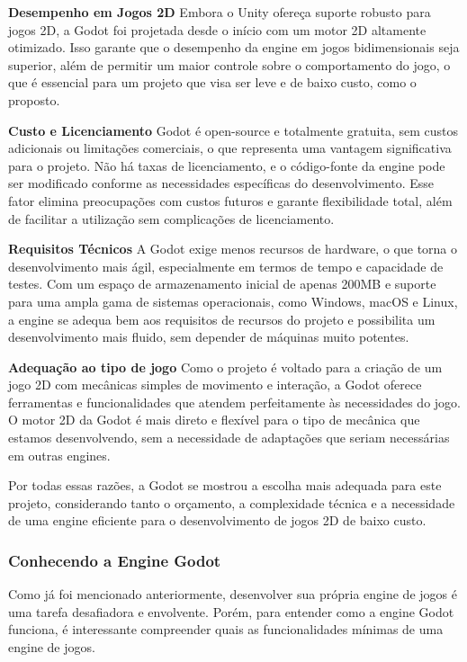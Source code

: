 \textbf{Desempenho em Jogos 2D}
Embora o Unity ofereça suporte robusto para jogos 2D, a Godot foi projetada desde o início com um motor 2D altamente otimizado. Isso garante que o desempenho da engine em jogos bidimensionais seja superior, além de permitir um maior controle sobre o comportamento do jogo, o que é essencial para um projeto que visa ser leve e de baixo custo, como o proposto.

\textbf{Custo e Licenciamento}
Godot é open-source e totalmente gratuita, sem custos adicionais ou limitações comerciais, o que representa uma vantagem significativa para o projeto. Não há taxas de licenciamento, e o código-fonte da engine pode ser modificado conforme as necessidades específicas do desenvolvimento. Esse fator elimina preocupações com custos futuros e garante flexibilidade total, além de facilitar a utilização sem complicações de licenciamento.

\textbf{Requisitos Técnicos}
A Godot exige menos recursos de hardware, o que torna o desenvolvimento mais ágil, especialmente em termos de tempo e capacidade de testes. Com um espaço de armazenamento inicial de apenas 200MB e suporte para uma ampla gama de sistemas operacionais, como Windows, macOS e Linux, a engine se adequa bem aos requisitos de recursos do projeto e possibilita um desenvolvimento mais fluido, sem depender de máquinas muito potentes.

\textbf{Adequação ao tipo de jogo}
Como o projeto é voltado para a criação de um jogo 2D com mecânicas simples de movimento e interação, a Godot oferece ferramentas e funcionalidades que atendem perfeitamente às necessidades do jogo. O motor 2D da Godot é mais direto e flexível para o tipo de mecânica que estamos desenvolvendo, sem a necessidade de adaptações que seriam necessárias em outras engines.

Por todas essas razões, a Godot se mostrou a escolha mais adequada para este projeto, considerando tanto o orçamento, a complexidade técnica e a necessidade de uma engine eficiente para o desenvolvimento de jogos 2D de baixo custo.


\subsubsection{Conhecendo a Engine Godot}

Como já foi mencionado anteriormente, desenvolver sua própria engine de jogos é uma tarefa desafiadora e envolvente. Porém, para entender como a engine Godot funciona, é interessante compreender quais as funcionalidades mínimas de uma engine de jogos.


